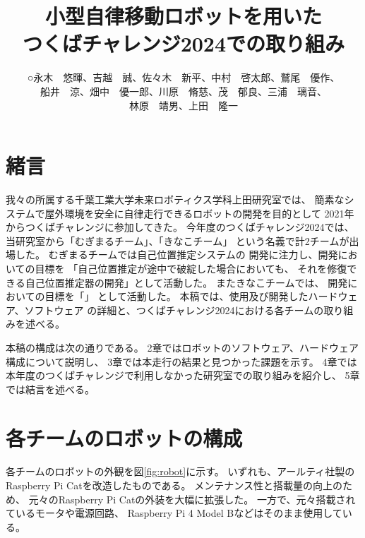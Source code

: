 \documentclass[twocolumn,9pt]{jsproceedings}
\title{小型自律移動ロボットを用いた\\つくばチャレンジ2024での取り組み}
\author{○永木　悠暉\authorrefmark{1}、吉越　誠\authorrefmark{2}、佐々木　新平\authorrefmark{1}、中村　啓太郎\authorrefmark{1}、鷲尾　優作\authorrefmark{1}、
\\船井　涼\authorrefmark{2}、畑中　優一郎\authorrefmark{2}、川原　脩慈\authorrefmark{1}、茂　郁良\authorrefmark{1}、三浦　璃音\authorrefmark{1}、
\\林原　靖男\authorrefmark{1}、上田　隆一\authorrefmark{1}}
\affiliation{千葉工業大学 未来ロボティクス学科 上田研究室 むぎまるチーム/きなこチーム}
\begin{document}
\maketitle


\section{緒言}

我々の所属する千葉工業大学未来ロボティクス学科上田研究室では、
簡素なシステムで屋外環境を安全に自律走行できるロボットの開発を目的として
2021年からつくばチャレンジに参加してきた。
今年度のつくばチャレンジ2024では、
当研究室から「むぎまるチーム」、「きなこチーム」
という名義で計2チームが出場した。
むぎまるチームでは自己位置推定システムの
開発に注力し、開発においての目標を
「自己位置推定が途中で破綻した場合においても、
それを修復できる自己位置推定器の開発」として活動した。
またきなこチームでは、
開発においての目標を「」
として活動した。
本稿では、使用及び開発したハードウェア、ソフトウェア
の詳細と、つくばチャレンジ2024における各チームの取り組みを述べる。

本稿の構成は次の通りである。
2章ではロボットのソフトウェア、ハードウェア構成について説明し、
3章では本走行の結果と見つかった課題を示す。
4章では本年度のつくばチャレンジで利用しなかった研究室での取り組みを紹介し、
5章では結言を述べる。

\section{各チームのロボットの構成}
各チームのロボットの外観を図\ref{fig:robot}に示す。
いずれも、アールティ社製の
Raspberry Pi Cat\cite{RTshop}を改造したものである。
メンテナンス性と搭載量の向上のため、
元々のRaspberry Pi Catの外装を大幅に拡張した。
一方で、元々搭載されているモータや電源回路、
Raspberry Pi 4 Model Bなどはそのまま使用している。
\end{document}
